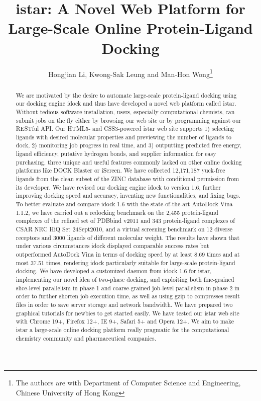 \documentclass[12pt]{article}
\title{istar: A Novel Web Platform for Large-Scale Online Protein-Ligand Docking}
\author{Hongjian Li, Kwong-Sak Leung and Man-Hon Wong\thanks{The authors are with Department of Computer Science and Engineering, Chinese University of Hong Kong}}
\begin{document}
\maketitle

\begin{abstract}
We are motivated by the desire to automate large-scale protein-ligand docking using our docking engine idock and thus have developed a novel web platform called istar. Without tedious software installation, users, especially computational chemists, can submit jobs on the fly either by browsing our web site or by programming against our RESTful API. Our HTML5- and CSS3-powered istar web site supports 1) selecting ligands with desired molecular properties and previewing the number of ligands to dock, 2) monitoring job progress in real time, and 3) outputting predicted free energy, ligand efficiency, putative hydrogen bonds, and supplier information for easy purchasing, three unique and useful features commonly lacked on other online docking platforms like DOCK Blaster or iScreen. We have collected 12,171,187 yuck-free ligands from the clean subset of the ZINC database with conditional permission from its developer. We have revised our docking engine idock to version 1.6, further improving docking speed and accuracy, inventing new functionalities, and fixing bugs. To better evaluate and compare idock 1.6 with the state-of-the-art AutoDock Vina 1.1.2, we have carried out a redocking benchmark on the 2,455 protein-ligand complexes of the refined set of PDBbind v2011 and 343 protein-ligand complexes of CSAR NRC HiQ Set 24Sept2010, and a virtual screening benchmark on 12 diverse receptors and 3000 ligands of different molecular weight. The results have shown that under various circumstances idock displayed comparable success rates but outperformed AutoDock Vina in terms of docking speed by at least 8.69 times and at most 37.51 times, rendering idock particularly suitable for large-scale protein-ligand docking. We have developed a customized daemon from idock 1.6 for istar, implementing our novel idea of two-phase docking, and exploiting both fine-grained slice-level parallelism in phase 1 and coarse-grained job-level parallelism in phase 2 in order to further shorten job execution time, as well as using gzip to compresses result files in order to save server storage and network bandwidth. We have prepared two graphical tutorials for newbies to get started easily. We have tested our istar web site with Chrome 19+, Firefox 12+, IE 9+, Safari 5+ and Opera 12+. We aim to make istar a large-scale online docking platform really pragmatic for the computational chemistry community and pharmaceutical companies.
\end{abstract}
\end{document}
